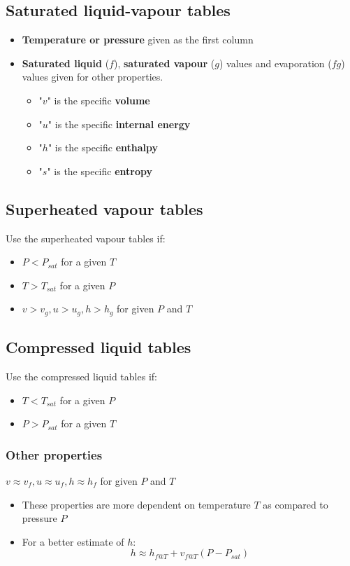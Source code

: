 \documentclass[11pt]{article}
\begin{document}
\subsection{Saturated liquid-vapour tables}
\label{sec:org37174ef}
\begin{itemize}
\item \textbf{Temperature or pressure} given as the first column
\item \textbf{Saturated liquid} (\(f\)), \textbf{saturated vapour} (\(g\)) values and evaporation (\(fg\)) values given for other properties.
\begin{itemize}
\item "\(v\)" is the specific \textbf{volume}
\item "\(u\)" is the specific \textbf{internal energy}
\item "\(h\)" is the specific \textbf{enthalpy}
\item "\(s\)" is the specific \textbf{entropy}
\end{itemize}
\end{itemize}

\subsection{Superheated vapour tables}
\label{sec:orgbccec85}
Use the superheated vapour tables if:
\begin{itemize}
\item \(P < P_{sat}\) for a given \(T\)
\item \(T > T_{sat}\) for a given \(P\)
\item \(v > v_g, u > u_g, h > h_g\) for given \(P\) and \(T\)
\end{itemize}

\subsection{Compressed liquid tables}
\label{sec:org7458488}
Use the compressed liquid tables if:
\begin{itemize}
\item \(T < T_{sat}\) for a given \(P\)
\item \(P > P_{sat}\) for a given \(T\)
\end{itemize}

\subsubsection{Other properties}
\label{sec:org8b193f9}
\(v \approx v_f, u \approx u_f, h \approx h_f\) for given \(P\) and \(T\)
\begin{itemize}
\item These properties are more dependent on temperature \(T\) as compared to pressure \(P\)
\item For a better estimate of \(h\):
\[h \approx h_{f@T} + v_{f@T} (P - P_{sat})\]
\end{itemize}
\end{document}
